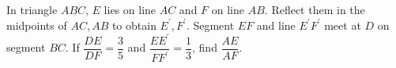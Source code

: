 In triangle $ABC$, $E$ lies on line $AC$ and $F$ on line $AB$. Reflect them in the midpoints of $AC,AB$ to obtain $E^{\prime},F^{\prime}$. Segment $EF$ and line $E^{\prime}F^{\prime}$ meet at $D$ on segment $BC$. If $\dfrac{D E}{D F} = \dfrac{3}{5}$ and $\dfrac{E E^{\prime}}{F F^{\prime}} = \dfrac{1}{3}$, find $\dfrac{A E}{A F}$.
